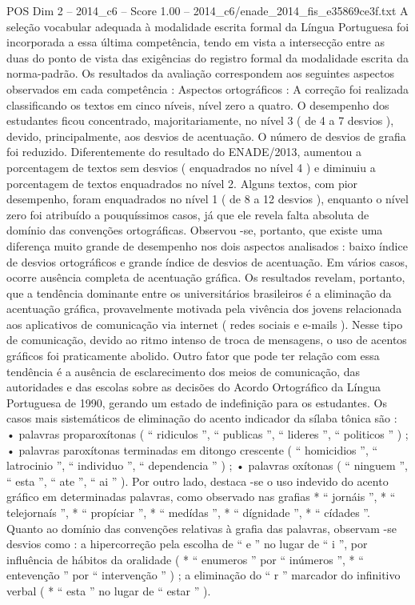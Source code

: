\begin{textsample}{POS Dim 2 – 2014\_c6 – Score 1.00 – 2014\_c6/enade\_2014\_fis\_e35869ce3f.txt}
A seleção vocabular adequada à modalidade escrita formal da Língua Portuguesa foi incorporada a essa última competência, tendo em vista a intersecção entre as duas do ponto de vista das exigências do registro formal da modalidade escrita da norma-padrão.
Os resultados da avaliação correspondem aos seguintes aspectos observados em cada competência : Aspectos ortográficos : A correção foi realizada classificando os textos em cinco níveis, nível zero a quatro.
O desempenho dos estudantes ficou concentrado, majoritariamente, no nível 3 ( de 4 a 7 desvios ), devido, principalmente, aos desvios de acentuação.
O número de desvios de grafia foi reduzido.
Diferentemente do resultado do ENADE/2013, aumentou a porcentagem de textos sem desvios ( enquadrados no nível 4 ) e diminuiu a porcentagem de textos enquadrados no nível 2.
Alguns textos, com pior desempenho, foram enquadrados no nível 1 ( de 8 a 12 desvios ), enquanto o nível zero foi atribuído a pouquíssimos casos, já que ele revela falta absoluta de domínio das convenções ortográficas.
Observou -se, portanto, que existe uma diferença muito grande de desempenho nos dois aspectos analisados : baixo índice de desvios ortográficos e grande índice de desvios de acentuação.
Em vários casos, ocorre ausência completa de acentuação gráfica.
Os resultados revelam, portanto, que a tendência dominante entre os universitários brasileiros é a eliminação da acentuação gráfica, provavelmente motivada pela vivência dos jovens relacionada aos aplicativos de comunicação via internet ( redes sociais e e-mails ).
Nesse tipo de comunicação, devido ao ritmo intenso de troca de mensagens, o uso de acentos gráficos foi praticamente abolido.
Outro fator que pode ter relação com essa tendência é a ausência de esclarecimento dos meios de comunicação, das autoridades e das escolas sobre as decisões do Acordo Ortográfico da Língua Portuguesa de 1990, gerando um estado de indefinição para os estudantes.
Os casos mais sistemáticos de eliminação do acento indicador da sílaba tônica são : • palavras proparoxítonas ( “ ridiculos ”, “ publicas ”, “ lideres ”, “ politicos ” ) ; • palavras paroxítonas terminadas em ditongo crescente ( “ homicidios ”, “ latrocinio ”, “ individuo ”, “ dependencia ” ) ; • palavras oxítonas ( “ ninguem ”, “ esta ”, “ ate ”, “ ai ” ).
Por outro lado, destaca -se o uso indevido do acento gráfico em determinadas palavras, como observado nas grafias * “ jornáis ”, * “ telejornaís ”, * “ propíciar ”, * “ medídas ”, * “ dígnidade ”, * “ cídades ”.
Quanto ao domínio das convenções relativas à grafia das palavras, observam -se desvios como : a hipercorreção pela escolha de “ e ” no lugar de “ i ”, por influência de hábitos da oralidade ( * “ enumeros ” por “ inúmeros ”, * “ entevenção ” por “ intervenção ” ) ; a eliminação do “ r ” marcador do infinitivo verbal ( * “ esta ” no lugar de “ estar ” ).

\end{textsample}
